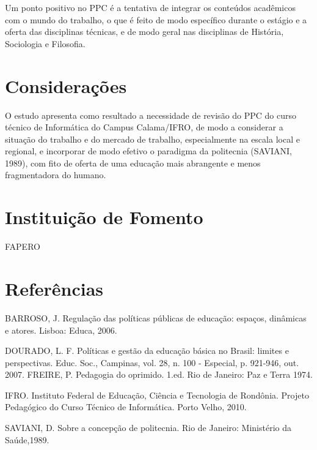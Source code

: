 \documentclass[article,12pt,onesidea,4paper,english,brazil]{abntex2}
\begin{document}
Um ponto positivo no PPC é a tentativa de integrar os conteúdos acadêmicos com o mundo do trabalho, o que é feito de modo específico durante o estágio e a oferta das disciplinas técnicas, e de modo geral nas disciplinas de História, Sociologia e Filosofia.
	\section*{Considerações}
	
	O estudo apresenta como resultado a necessidade de revisão do PPC do curso técnico de Informática do Campus Calama/IFRO, de modo a considerar a situação do trabalho e do mercado de trabalho, especialmente na escala local e regional, e incorporar de modo efetivo o paradigma da politecnia (SAVIANI, 1989), com fito de oferta de uma educação mais abrangente e menos fragmentadora do humano.
	\section*{Instituição de Fomento}
	
	FAPERO
	
	\section*{Referências}
	
	\noindent BARROSO, J. Regulação das políticas públicas de educação: espaços, dinâmicas e atores. Lisboa: Educa, 2006.
	
	\noindent DOURADO, L. F. Políticas e gestão da educação básica no Brasil: limites e perspectivas. Educ. Soc., Campinas, vol. 28, n. 100 - Especial, p. 921-946, out. 2007.
	FREIRE, P. Pedagogia do oprimido. 1.ed. Rio de Janeiro: Paz e Terra 1974.
	
	\noindent IFRO. Instituto Federal de Educação, Ciência e Tecnologia de Rondônia. Projeto Pedagógico do Curso Técnico de Informática. Porto Velho, 2010.
	
	\noindent SAVIANI, D. Sobre a concepção de politecnia. Rio de Janeiro: Ministério da Saúde,1989.
	
	
	
	
\end{document}
